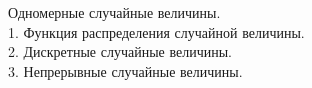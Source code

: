 
Одномерные случайные величины. \\

1. Функция распределения случайной величины. \\


2. Дискретные случайные величины. \\


3. Непрерывные случайные величины. \\
